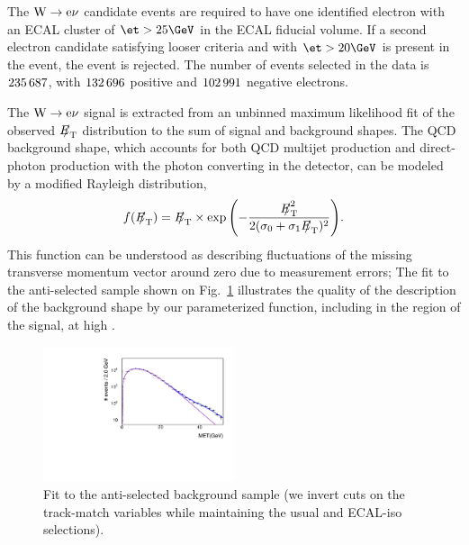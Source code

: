 The $\mathrm{W} \rightarrow \mathrm{e}\nu$ candidate events are required to have one identified electron
with an ECAL cluster of $\et > 25\GeV$ in the ECAL fiducial volume.
If a second electron candidate
satisfying looser criteria and with $\et > 20\GeV$ is present in
the event, the event is rejected.
The number of events selected in the data
is $235\,687 $, with $132\,696 $ positive and $102\,991 $
negative electrons.
\par
The $\mathrm{W} \rightarrow \mathrm{e}\nu$ signal is extracted from an unbinned maximum likelihood
fit of the observed ${E\!\!\!/}_{\mathrm{T}}$ distribution to the sum of signal and
background shapes.
The QCD background shape, which accounts
for both QCD multijet production and direct-photon
production with the photon converting in the detector,
can be modeled by a modified Rayleigh distribution,
$$f(\MET) = \MET \times \exp{\left(-\frac{\MET^2}{2(\sigma_0+\sigma_1\MET)^2}\right)}.$$
This function can be understood as describing fluctuations of the
missing transverse momentum vector around zero due to measurement errors;
The fit to the anti-selected sample shown on
Fig.~\ref{fig:e-inverted} illustrates the quality of the description
of the background shape by our parameterized function,
including in the region of the signal, at high \MET.
\begin{figure}[b]
\begin{center}
\includegraphics[width=0.50\textwidth]{figs/fixedMCyield_normal_model.pdf}
\caption{Fit to the anti-selected background sample (we invert cuts on the track-match
variables while maintaining the usual \ET and ECAL-iso selections).
}\label{fig:e-inverted}
\end{center}
\end{figure}


